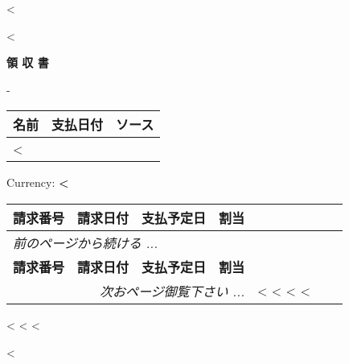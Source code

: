 <%

\begin{CJK}{UTF8}{arialuni}

\vspace*{-3.3cm}
<%
\vspace*{0.5cm}

\centerline{\large\bf{領 収 書}}
\normalsize

\vspace{2.5cm}
-
\vspace{0.5cm}

\begin{tabularx}{\textwidth}{*{3}{|X}|} \hline
  \textbf{名前} & \textbf{支払日付} & \textbf{ソース} \\ 
  \hline
	<%
  \hline
\end{tabularx}

\vspace{0.5cm}
Currency: \textbf{<%
}
\vspace{0.5cm}  

\begin{longtable}{|l p{5.5cm} @{\extracolsep\fill} rr|} \hline
  \textbf{請求番号} & \textbf{請求日付} & \textbf{支払予定日} & \textbf{割当} \\     
  \hline
\endfirsthead
  \multicolumn{3}{l}{\emph{前のページから続ける ...}} \\
  \hline
  \textbf{請求番号} & \textbf{請求日付} & \textbf{支払予定日} & \textbf{割当} \\     
  \hline
\endhead
   \hline \multicolumn{4}{r}{\emph{次おページ御覧下さい ...}}
\endfoot
   \hline
   \multicolumn{3}{|r} \textbf{合計} & <%
	\hline
\endlastfoot
<%
  <%
<%
\end{longtable}

\vspace{1cm}

<%
  <%
<%

\vfill
<%
\end{CJK}

